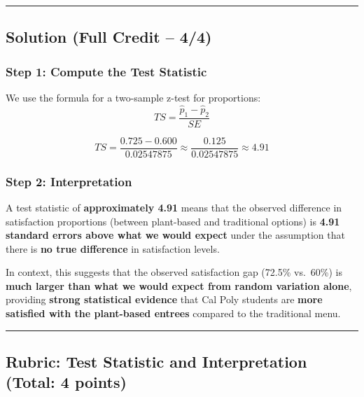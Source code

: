 \documentclass[
  letterpaper,
  DIV=11,
  numbers=noendperiod]{scrartcl}
\begin{document}
\begin{center}\rule{0.5\linewidth}{0.5pt}\end{center}

\hypertarget{solution-full-credit-44}{%
\subsection{\texorpdfstring{\textbf{Solution (Full Credit --
4/4)}}{Solution (Full Credit -- 4/4)}}\label{solution-full-credit-44}}

\hypertarget{step-1-compute-the-test-statistic}{%
\subsubsection{\texorpdfstring{\textbf{Step 1: Compute the Test
Statistic}}{Step 1: Compute the Test Statistic}}\label{step-1-compute-the-test-statistic}}

We use the formula for a two-sample z-test for proportions: \[
TS = \frac{\hat{p}_1 - \hat{p}_2}{SE}
\]

\[
TS = \frac{0.725 - 0.600}{0.02547875} \approx \frac{0.125}{0.02547875} \approx 4.91
\]

\hypertarget{step-2-interpretation}{%
\subsubsection{\texorpdfstring{\textbf{Step 2:
Interpretation}}{Step 2: Interpretation}}\label{step-2-interpretation}}

A test statistic of \textbf{approximately 4.91} means that the observed
difference in satisfaction proportions (between plant-based and
traditional options) is \textbf{4.91 standard errors above what we would
expect} under the assumption that there is \textbf{no true difference}
in satisfaction levels.

In context, this suggests that the observed satisfaction gap (72.5\%
vs.~60\%) is \textbf{much larger than what we would expect from random
variation alone}, providing \textbf{strong statistical evidence} that
Cal Poly students are \textbf{more satisfied with the plant-based
entrees} compared to the traditional menu.

\begin{center}\rule{0.5\linewidth}{0.5pt}\end{center}

\hypertarget{rubric-test-statistic-and-interpretation-total-4-points}{%
\subsection{\texorpdfstring{\textbf{Rubric: Test Statistic and
Interpretation (Total: 4
points)}}{Rubric: Test Statistic and Interpretation (Total: 4 points)}}\label{rubric-test-statistic-and-interpretation-total-4-points}}
\end{document}
